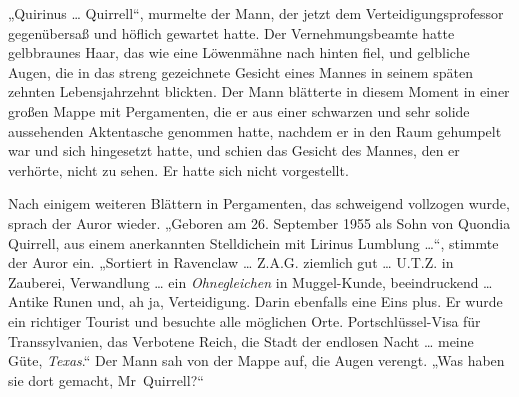 „Quirinus … Quirrell“, murmelte der Mann, der jetzt dem Verteidigungsprofessor gegenübersaß und höflich gewartet hatte. Der Vernehmungsbeamte hatte gelbbraunes Haar, das wie eine Löwenmähne nach hinten fiel, und gelbliche Augen, die in das streng gezeichnete Gesicht eines Mannes in seinem späten zehnten Lebensjahrzehnt blickten. Der Mann blätterte in diesem Moment in einer großen Mappe mit Pergamenten, die er aus einer schwarzen und sehr solide aussehenden Aktentasche genommen hatte, nachdem er in den Raum gehumpelt war und sich hingesetzt hatte, und schien das Gesicht des Mannes, den er verhörte, nicht zu sehen. Er hatte sich nicht vorgestellt.

Nach einigem weiteren Blättern in Pergamenten, das schweigend vollzogen wurde, sprach der Auror wieder.
„Geboren am 26. September 1955 als Sohn von Quondia Quirrell, aus einem anerkannten Stelldichein mit Lirinus Lumblung …“, stimmte der Auror ein.
„Sortiert in Ravenclaw … Z.A.G. ziemlich gut … U.T.Z. in Zauberei, Verwandlung … ein \emph{Ohnegleichen} in Muggel-Kunde, beeindruckend … Antike Runen und, ah ja, Verteidigung. Darin ebenfalls eine Eins plus. Er wurde ein richtiger Tourist und besuchte alle möglichen Orte. Portschlüssel-Visa für Transsylvanien, das Verbotene Reich, die Stadt der endlosen Nacht … meine Güte, \emph{Texas}.“
Der Mann sah von der Mappe auf, die Augen verengt.
„Was haben sie dort gemacht, Mr~Quirrell?“

